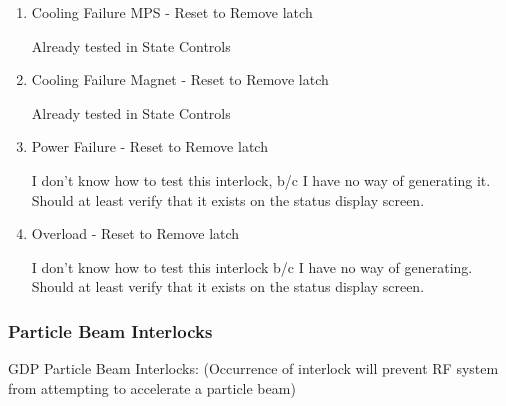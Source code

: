 \documentclass[11pt]{book}		%
\begin{document}
\begin{enumerate}
 \item Cooling Failure MPS - Reset to Remove latch

\color{red}
Already tested in State Controls
\color{black}

 \item Cooling Failure Magnet - Reset to Remove latch

\color{red}
Already tested in State Controls
\color{black}

 \item Power Failure - Reset to Remove latch

\color{red}
I don't know how to test this interlock, b/c I have no way of generating it. Should at least verify that it exists on the status display screen.
\color{black}

\item Overload - Reset to Remove latch

\color{red}
I don't know how to test this interlock b/c I have no way of generating. Should at least verify that it exists on the status display screen.
\color{black}

\end{enumerate}

\subsubsection{Particle Beam Interlocks}

GDP Particle Beam Interlocks:
(Occurrence of interlock will prevent RF system from attempting to accelerate a particle beam)
\end{document}
